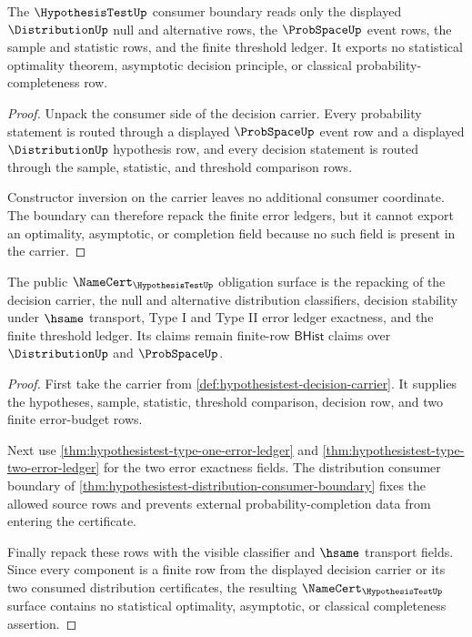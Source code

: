 \begin{theorem}
\label{thm:hypothesistest-distribution-consumer-boundary}
The $\HypothesisTestUp$ consumer boundary reads only the displayed
$\DistributionUp$ null and alternative rows, the $\ProbSpaceUp$ event rows, the
sample and statistic rows, and the finite threshold ledger. It exports no
statistical optimality theorem, asymptotic decision principle, or classical
probability-completeness row.
\end{theorem}
\begin{proof}
Unpack the consumer side of the decision carrier. Every probability statement
is routed through a displayed $\ProbSpaceUp$ event row and a displayed
$\DistributionUp$ hypothesis row, and every decision statement is routed
through the sample, statistic, and threshold comparison rows.

Constructor inversion on the carrier leaves no additional consumer coordinate.
The boundary can therefore repack the finite error ledgers, but it cannot
export an optimality, asymptotic, or completion field because no such field is
present in the carrier.
\end{proof}

\begin{theorem}
\label{thm:hypothesistest-namecert-obligation-surface}
The public $\NameCert_{\HypothesisTestUp}$ obligation surface is the repacking
of the decision carrier, the null and alternative distribution classifiers,
decision stability under $\hsame$ transport, Type I and Type II error ledger
exactness, and the finite threshold ledger. Its claims remain finite-row
$\mathsf{BHist}$ claims over $\DistributionUp$ and $\ProbSpaceUp$.
\end{theorem}
\begin{proof}
First take the carrier from
\autoref{def:hypothesistest-decision-carrier}. It supplies the hypotheses,
sample, statistic, threshold comparison, decision row, and two finite
error-budget rows.

Next use \autoref{thm:hypothesistest-type-one-error-ledger} and
\autoref{thm:hypothesistest-type-two-error-ledger} for the two error exactness
fields. The distribution consumer boundary of
\autoref{thm:hypothesistest-distribution-consumer-boundary} fixes the allowed
source rows and prevents external probability-completion data from entering the
certificate.

Finally repack these rows with the visible classifier and $\hsame$ transport
fields. Since every component is a finite row from the displayed decision
carrier or its two consumed distribution certificates, the resulting
$\NameCert_{\HypothesisTestUp}$ surface contains no statistical optimality,
asymptotic, or classical completeness assertion.
\end{proof}

